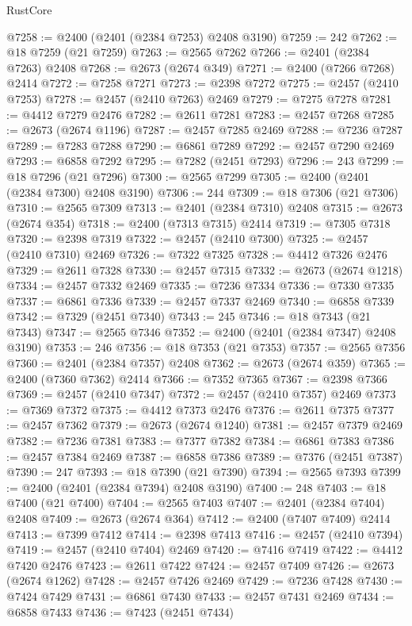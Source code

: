 \begin{lexlean}{RustCore}
\begin{coremodule}
@7258 := @2400 (@2401 (@2384 @7253) @2408 @3190)
@7259 := 242
@7262 := @18 @7259 (@21 @7259)
@7263 := @2565 @7262
@7266 := @2401 (@2384 @7263) @2408
@7268 := @2673 (@2674 @349)
@7271 := @2400 (@7266 @7268) @2414
@7272 := @7258 @7271
@7273 := @2398 @7272
@7275 := @2457 (@2410 @7253)
@7278 := @2457 (@2410 @7263) @2469
@7279 := @7275 @7278
@7281 := @4412 @7279 @2476
@7282 := @2611 @7281
@7283 := @2457 @7268
@7285 := @2673 (@2674 @1196)
@7287 := @2457 @7285 @2469
@7288 := @7236 @7287
@7289 := @7283 @7288
@7290 := @6861 @7289
@7292 := @2457 @7290 @2469
@7293 := @6858 @7292
@7295 := @7282 (@2451 @7293)
@7296 := 243
@7299 := @18 @7296 (@21 @7296)
@7300 := @2565 @7299
@7305 := @2400 (@2401 (@2384 @7300) @2408 @3190)
@7306 := 244
@7309 := @18 @7306 (@21 @7306)
@7310 := @2565 @7309
@7313 := @2401 (@2384 @7310) @2408
@7315 := @2673 (@2674 @354)
@7318 := @2400 (@7313 @7315) @2414
@7319 := @7305 @7318
@7320 := @2398 @7319
@7322 := @2457 (@2410 @7300)
@7325 := @2457 (@2410 @7310) @2469
@7326 := @7322 @7325
@7328 := @4412 @7326 @2476
@7329 := @2611 @7328
@7330 := @2457 @7315
@7332 := @2673 (@2674 @1218)
@7334 := @2457 @7332 @2469
@7335 := @7236 @7334
@7336 := @7330 @7335
@7337 := @6861 @7336
@7339 := @2457 @7337 @2469
@7340 := @6858 @7339
@7342 := @7329 (@2451 @7340)
@7343 := 245
@7346 := @18 @7343 (@21 @7343)
@7347 := @2565 @7346
@7352 := @2400 (@2401 (@2384 @7347) @2408 @3190)
@7353 := 246
@7356 := @18 @7353 (@21 @7353)
@7357 := @2565 @7356
@7360 := @2401 (@2384 @7357) @2408
@7362 := @2673 (@2674 @359)
@7365 := @2400 (@7360 @7362) @2414
@7366 := @7352 @7365
@7367 := @2398 @7366
@7369 := @2457 (@2410 @7347)
@7372 := @2457 (@2410 @7357) @2469
@7373 := @7369 @7372
@7375 := @4412 @7373 @2476
@7376 := @2611 @7375
@7377 := @2457 @7362
@7379 := @2673 (@2674 @1240)
@7381 := @2457 @7379 @2469
@7382 := @7236 @7381
@7383 := @7377 @7382
@7384 := @6861 @7383
@7386 := @2457 @7384 @2469
@7387 := @6858 @7386
@7389 := @7376 (@2451 @7387)
@7390 := 247
@7393 := @18 @7390 (@21 @7390)
@7394 := @2565 @7393
@7399 := @2400 (@2401 (@2384 @7394) @2408 @3190)
@7400 := 248
@7403 := @18 @7400 (@21 @7400)
@7404 := @2565 @7403
@7407 := @2401 (@2384 @7404) @2408
@7409 := @2673 (@2674 @364)
@7412 := @2400 (@7407 @7409) @2414
@7413 := @7399 @7412
@7414 := @2398 @7413
@7416 := @2457 (@2410 @7394)
@7419 := @2457 (@2410 @7404) @2469
@7420 := @7416 @7419
@7422 := @4412 @7420 @2476
@7423 := @2611 @7422
@7424 := @2457 @7409
@7426 := @2673 (@2674 @1262)
@7428 := @2457 @7426 @2469
@7429 := @7236 @7428
@7430 := @7424 @7429
@7431 := @6861 @7430
@7433 := @2457 @7431 @2469
@7434 := @6858 @7433
@7436 := @7423 (@2451 @7434)

\end{coremodule}
\end{lexlean}
